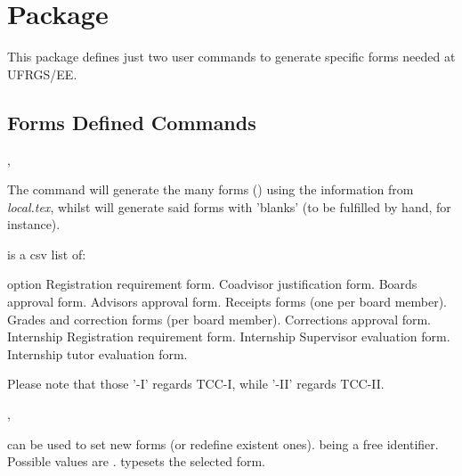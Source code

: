 \documentclass[article,nogeometry,english,tocdepth=3,secdepth=3]{ufrgscca} %
\begin{document}
\section{ Package}
This package defines just two user commands to generate specific forms needed at UFRGS/EE.
\subsection{Forms Defined Commands}\label{forms.commands}
\begin{codedescribe}[code,update=2023/05/29]{\tcforms,\tcemptyforms}
	\begin{codesyntax}%
\end{codesyntax}
The command \tsmacro{\tcforms}{} will generate the many forms () using the information from \emph{local.tex}, whilst \tsmacro{\tcemptyforms}{} will generate said forms with 'blanks' (to be fulfilled by hand, for instance).

\end{codedescribe}

 is a csv list of:
\begin{describelist*}{option}
     {}
     { Registration requirement form.}
     {}
     { Coadvisor justification form.}
     {}
     { Boards approval form.}
     {}
     { Advisors approval form.}
     { Receipts forms (one per board member).}
     {}
     { Grades and correction forms (per board member).}
     {}
     { Corrections approval  form.}
     { Internship Registration requirement form.}
     { Internship Supervisor evaluation form.}
     { Internship tutor evaluation form.}
\end{describelist*}
Please note that those '-I' regards TCC-I, while '-II' regards TCC-II.

\begin{codedescribe}[code,new=2023/11/18]{\SetForm,\MakeForm}
	\begin{codesyntax}%
\end{codesyntax}
\tsobj{\SetForm} can be used to set new forms (or redefine existent ones).  being a free identifier. Possible  values are . \tsobj{\MakeForm} typesets the selected form.
\end{codedescribe}
\end{document}
